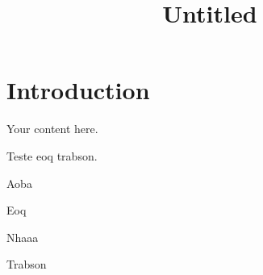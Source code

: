 \documentclass{article}
\title{Untitled}
\author{}
\date{}
\begin{document}
\maketitle

\section{Introduction}

Your content here.

Teste eoq trabson.

Aoba


Eoq

Nhaaa

Trabson
\end{document}
